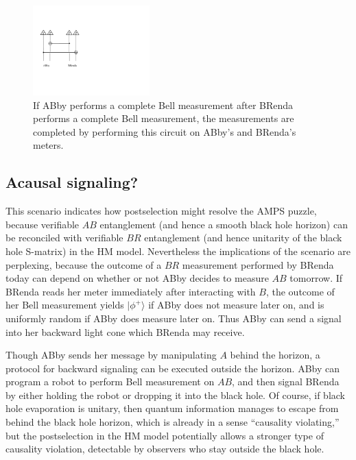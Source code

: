 \documentclass[11pt]{article}
\begin{document}
\begin{figure}[t]
\begin{center}
\includegraphics[width=0.4\textwidth]{decode-full-bell.pdf}
\end{center}
\caption{If ABby performs a complete Bell measurement after BRenda performs a complete Bell measurement, the measurements are completed by performing this circuit on ABby's and BRenda's meters.}
\label{fig:decode-full-bell}
\end{figure}

\subsection{Acausal signaling?}

This scenario indicates how postselection might resolve the AMPS puzzle, because verifiable $AB$ entanglement (and hence a smooth black hole horizon) can be reconciled with verifiable $BR$ entanglement (and hence unitarity of the black hole S-matrix) in the HM model. Nevertheless the implications of the scenario are perplexing, because the outcome of a $BR$ measurement performed by BRenda today can depend on whether or not ABby decides to measure $AB$ tomorrow. If BRenda reads her meter immediately after interacting with $B$, the outcome of her Bell measurement yields $|\phi^+\rangle$ if ABby does not measure later on, and is uniformly random if ABby does measure later on. Thus ABby can send a signal into her backward light cone which BRenda may receive. 

Though ABby sends her message by manipulating $A$ behind the horizon, a protocol for backward signaling can be executed outside the horizon. ABby can program a robot to perform Bell measurement on $AB$, and then signal BRenda by either holding the robot or dropping it into the black hole. Of course, if black hole evaporation is unitary, then quantum information manages to escape from behind the black hole horizon, which is already in a sense ``causality violating,'' but the postselection in the HM model potentially allows a stronger type of causality violation, detectable by observers who stay outside the black hole.
\end{document}
